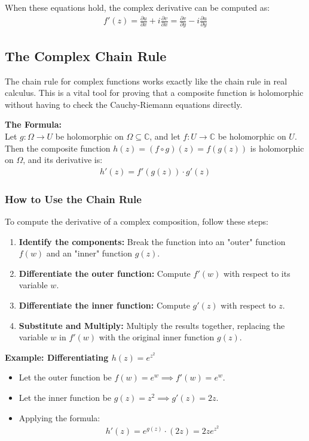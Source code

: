 \documentclass[a4paper,11pt]{article}
\begin{document}
When these equations hold, the complex derivative can be computed as:
\begin{align*}
    f'(z) = \frac{\partial u}{\partial x} + i \frac{\partial v}{\partial x} = \frac{\partial v}{\partial y} - i \frac{\partial u}{\partial y}
\end{align*}
\subsection{The Complex Chain Rule}
The chain rule for complex functions works exactly like the chain rule in real calculus. This is a vital tool for proving that a composite function is holomorphic without having to check the Cauchy-Riemann equations directly.

\textbf{The Formula:} \\
Let $g: \Omega \to U$ be holomorphic on $\Omega \subseteq \mathbb{C}$, and let $f: U \to \mathbb{C}$ be holomorphic on $U$. Then the composite function $h(z) = (f \circ g)(z) = f(g(z))$ is holomorphic on $\Omega$, and its derivative is:
\begin{align*}
    h'(z) = f'(g(z)) \cdot g'(z)
\end{align*}

\subsubsection{How to Use the Chain Rule}
To compute the derivative of a complex composition, follow these steps:
\begin{enumerate}
    \item \textbf{Identify the components:} Break the function into an "outer" function $f(w)$ and an "inner" function $g(z)$.
    \item \textbf{Differentiate the outer function:} Compute $f'(w)$ with respect to its variable $w$.
    \item \textbf{Differentiate the inner function:} Compute $g'(z)$ with respect to $z$.
    \item \textbf{Substitute and Multiply:} Multiply the results together, replacing the variable $w$ in $f'(w)$ with the original inner function $g(z)$.
\end{enumerate}

\textbf{Example: Differentiating $h(z) = e^{z^2}$}
\begin{itemize}
    \item Let the outer function be $f(w) = e^w \implies f'(w) = e^w$.
    \item Let the inner function be $g(z) = z^2 \implies g'(z) = 2z$.
    \item Applying the formula:
    \begin{align*}
        h'(z) = e^{g(z)} \cdot (2z) = 2z e^{z^2}
    \end{align*}
\end{itemize}
\end{document}
